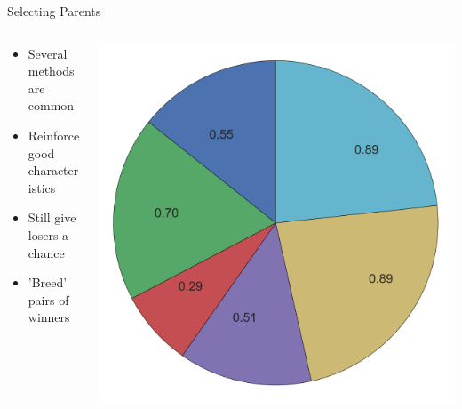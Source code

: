 \documentclass[10pt]{beamer}
\begin{document}
\begin{frame}{Selecting Parents}
	\begin{columns}[c] %
		\begin{column}{.48\textwidth}
			\begin{itemize}
				\item {Several methods are common}
				\item {Reinforce good characteristics}
				\item {Still give losers a chance}
				\item {'Breed' pairs of winners}
			\end{itemize}				
		\end{column}
		\hfill
		\begin{column}{0.48\textwidth}
		    \begin{overprint}
				\includegraphics[width=\linewidth]{images/pie1.png}

\end{overprint}
\end{column}
\end{columns}
\end{frame}
\end{document}
